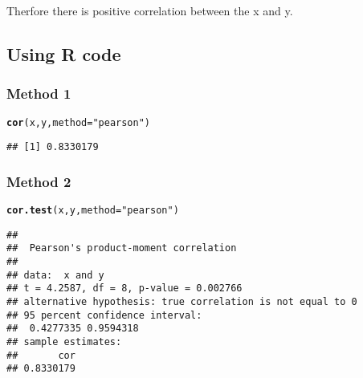 \documentclass{article}\usepackage[]{graphicx}\usepackage[]{xcolor}
\makeatletter
\newcommand{\hlsng}[1]{\textcolor[rgb]{0.192,0.494,0.8}{#1}}%
\newcommand{\hldef}[1]{\textcolor[rgb]{0.345,0.345,0.345}{#1}}%
\newcommand{\hlkwc}[1]{\textcolor[rgb]{0.333,0.667,0.333}{#1}}%
\newcommand{\hlkwd}[1]{\textcolor[rgb]{0.737,0.353,0.396}{\textbf{#1}}}%
\newenvironment{kframe}{%
 \def\at@end@of@kframe{}%
 \ifinner\ifhmode%
  \def\at@end@of@kframe{\end{minipage}}%
  \begin{minipage}{\columnwidth}%
 \fi\fi%
 \def\FrameCommand##1{\hskip\@totalleftmargin \hskip-\fboxsep
 \colorbox{shadecolor}{##1}\hskip-\fboxsep
     \hskip-\linewidth \hskip-\@totalleftmargin \hskip\columnwidth}%
 \MakeFramed {\advance\hsize-\width
   \@totalleftmargin\z@ \linewidth\hsize
   \@setminipage}}%
 {\par\unskip\endMakeFramed%
 \at@end@of@kframe}
\newenvironment{knitrout}{}{} %
\makeatother
\begin{document}
Therfore there is positive correlation between the x and y.
\subsection{Using R code}
\subsubsection{Method 1}
\begin{knitrout}
\color{fgcolor}\begin{kframe}
\begin{alltt}
\hlkwd{cor}\hldef{(x,y,} \hlkwc{method} \hldef{=}\hlsng{"pearson"} \hldef{)}
\end{alltt}
\begin{verbatim}
## [1] 0.8330179
\end{verbatim}
\end{kframe}
\end{knitrout}
\subsubsection{Method 2}
\begin{knitrout}
\color{fgcolor}\begin{kframe}
\begin{alltt}
\hlkwd{cor.test}\hldef{(x,y,}\hlkwc{method}\hldef{=}\hlsng{"pearson"}\hldef{)}
\end{alltt}
\begin{verbatim}
## 
## 	Pearson's product-moment correlation
## 
## data:  x and y
## t = 4.2587, df = 8, p-value = 0.002766
## alternative hypothesis: true correlation is not equal to 0
## 95 percent confidence interval:
##  0.4277335 0.9594318
## sample estimates:
##       cor 
## 0.8330179
\end{verbatim}
\end{kframe}
\end{knitrout}
\end{document}
